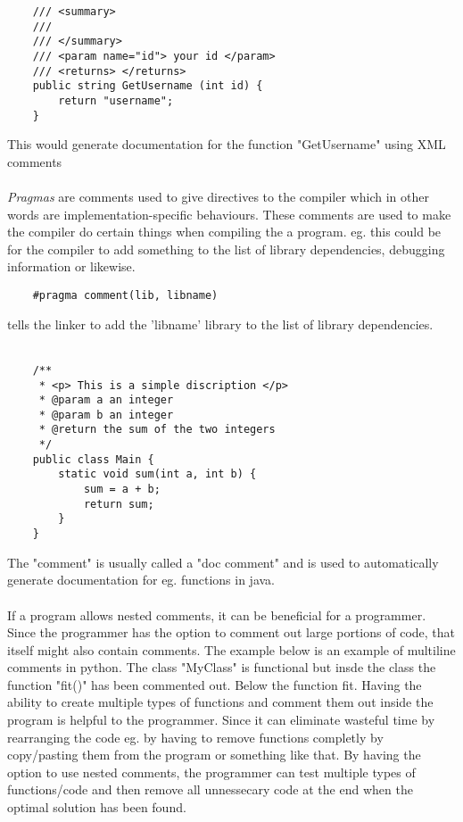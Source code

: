 \begin{verbatim}
    /// <summary>
    ///
    /// </summary>
    /// <param name="id"> your id </param>
    /// <returns> </returns>
    public string GetUsername (int id) {
        return "username";
    }
\end{verbatim}
This would generate documentation for the function "GetUsername" using XML comments
\\
\\
\emph{Pragmas} are comments used to give directives to the compiler which in other words
are implementation-specific behaviours. These comments are used to make the compiler do certain things
when compiling the a program. eg. this could be for the compiler to add something to the list
of library dependencies, debugging information or likewise.

\begin{verbatim}
    #pragma comment(lib, libname)
\end{verbatim}
tells the linker to add the 'libname' library to the list of library dependencies.
\\
\\

\begin{verbatim}
    /**
     * <p> This is a simple discription </p>
     * @param a an integer
     * @param b an integer
     * @return the sum of the two integers
     */
    public class Main {
        static void sum(int a, int b) {
            sum = a + b;
            return sum;
        }
    }
\end{verbatim}
The "comment" is usually called a "doc comment" and is used to automatically generate documentation for
eg. functions in java.
\\
\\

If a program allows nested comments, it can be beneficial for a programmer. Since the programmer has the option
to comment out large portions of code, that itself might also contain comments. The example below is an example
of multiline comments in python. The class "MyClass" is functional but insde the class the function "fit()" has been
commented out. Below the function fit. Having the ability to create multiple types of functions and comment them out
inside the program is helpful to the programmer. Since it can eliminate wasteful time by rearranging the code eg. by having
to remove functions completly by copy/pasting them from the program or something like that. By having the option to
use nested comments, the programmer can test multiple types of functions/code and then remove all unnessecary code at the 
end when the optimal solution has been found.

